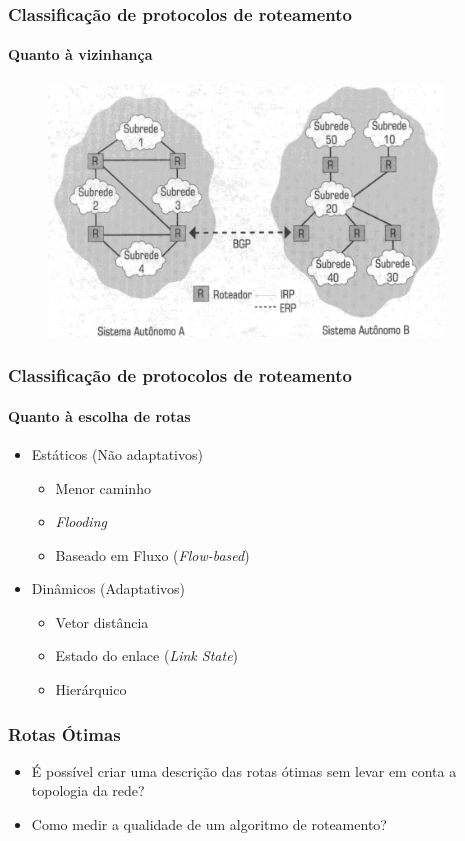 \documentclass{beamer}
\begin{document}
\begin{frame}
\frametitle{Classificação de protocolos de roteamento}
\framesubtitle{Quanto à vizinhança}
\begin{figure}[htp]
\begin{center}
  \includegraphics[width=105mm]{Imagens/SistemaAutonomo.png}
  \label{sistema_autonomo}
\end{center}
\end{figure}
\end{frame}

\begin{frame}
\frametitle{Classificação de protocolos de roteamento}
\framesubtitle{Quanto à escolha de rotas}
\begin{itemize}
  \item Estáticos (Não adaptativos)
  \begin{itemize}
     \item Menor caminho
     \item \emph{Flooding}
     \item Baseado em Fluxo (\emph{Flow-based}) 
  \end{itemize}
  \item Dinâmicos (Adaptativos)
  \begin{itemize}
     \item Vetor distância
     \item Estado do enlace (\emph{Link State})
     \item Hierárquico 
  \end{itemize}
\end{itemize}

\end{frame}

\begin{frame}
\frametitle{Rotas Ótimas}
\begin{itemize}
  \setlength{\itemsep}{0.7cm}%
  \item É possível criar uma descrição das rotas ótimas sem levar em conta a
  topologia da rede?
  \item Como medir a qualidade de um algoritmo de roteamento?
\end{itemize}
\end{frame}
\end{document}
